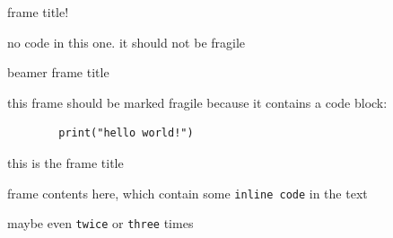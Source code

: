 
\begin{frame}{frame title!}

    no code in this one. it should not be fragile

\end{frame}

\begin{frame}[fragile]{beamer frame title}

    this frame should be marked fragile because it contains a code block:

    \begin{verbatim}
        print("hello world!")
    \end{verbatim}

\end{frame}

\begin{frame}[fragile]{this is the frame title}

    frame contents here, which contain some \verb|inline code| in the text

    maybe even \verb|twice| or \verb|three|  times

\end{frame}